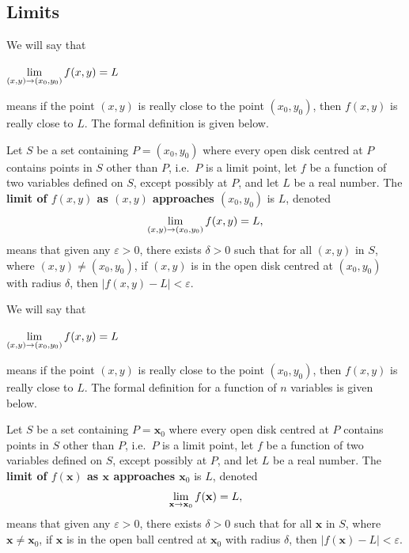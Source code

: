 \subsection{Limits}
\ifcalculus
We will say that 


\begin{center}
$\displaystyle \lim_{(x,y)\to (x_0,y_0)} f(x,y) = L$ \end{center}
means if the point $(x,y)$ is really close to the point $(x_0,y_0)$, then $f(x,y)$ is really close to $L$. The formal definition is given below.




\begin{definition}\label{def:multilimita}
Let $S$ be a set containing $P=(x_0,y_0)$ where every open disk centred at $P$ contains points in $S$ other than $P$, i.e.\ $P$ is a limit point, let $f$ be a function of two variables defined on $S$, except possibly at $P$, and let $L$ be a real number. 
The \textbf{limit of $f(x,y)$ as $(x,y)$ approaches $(x_0,y_0)$} is $L$, denoted $$\displaystyle \lim_{(x,y)\to (x_0,y_0)} f(x,y) = L,$$
means that given any $\varepsilon>0$, there exists $\delta>0$ such that for all  $(x,y)$ in $S$, where $(x,y)\neq (x_0,y_0)$, if $(x,y)$ is in the open disk centred at $(x_0,y_0)$ with radius $\delta$, then $|f(x,y) - L|<\varepsilon.$
\end{definition}
\fi


\ifanalysis
We will say that 


\begin{center}
$\displaystyle \lim_{(x,y)\to (x_0,y_0)} f(x,y) = L$ \end{center}
means if the point $(x,y)$ is really close to the point $(x_0,y_0)$, then $f(x,y)$ is really close to $L$. The formal definition for a function of $n$ variables is given below.




\begin{definition}\label{def:multilimita}
Let $S$ be a set containing $P=\mathbf{x}_0$ where every open disk centred at $P$ contains points in $S$ other than $P$, i.e.\ $P$ is a limit point, let $f$ be a function of two variables defined on $S$, except possibly at $P$, and let $L$ be a real number. 
The \textbf{limit of $f(\mathbf{x})$ as $\mathbf{x}$ approaches $\mathbf{x}_0$} is $L$, denoted $$\displaystyle \lim_{\mathbf{x}\to \mathbf{x}_0} f(\mathbf{x}) = L,$$
means that given any $\varepsilon>0$, there exists $\delta>0$ such that for all  $\mathbf{x}$ in $S$, where $\mathbf{x}\neq \mathbf{x}_0$, if $\mathbf{x}$ is in the open ball centred at $\mathbf{x}_0$ with radius $\delta$, then $|f(\mathbf{x}) - L|<\varepsilon.$
\end{definition}
\fi


